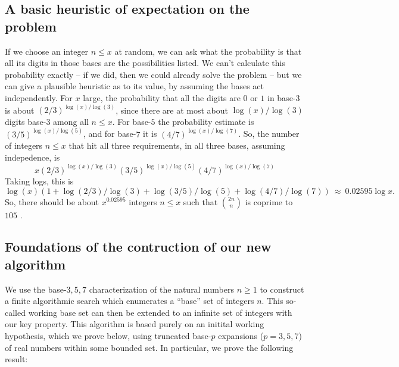 \documentclass[12pt]{article}
\begin{document}
\subsection{A basic heuristic of expectation on the problem}

If we choose an integer $n \leq x$ at random, we can ask what the 
probability is that all its digits in those bases are the possibilities 
listed.  We can't calculate this probability exactly -- if we did, then we
could already solve the problem -- but we can give a plausible heuristic
as to its value, by assuming the bases act independently.  For $x$ large,
the probability that all the digits are $0$ or $1$ in base-$3$ is 
about $(2/3)^{\log(x)/\log(3)}$, since there are at most 
about $\log(x)/\log(3)$ digits base-$3$ among all $n \leq x$.  For base-$5$
the probability estimate is $(3/5)^{\log(x)/\log(5)}$, and for base-$7$
it is $(4/7)^{\log(x)/\log(7)}$.  So, the number of integers $n \leq x$
that hit all three requirements, in all three bases, assuming indepedence,
is 
$$
x (2/3)^{\log(x)/\log(3)} (3/5)^{\log(x)/\log(5)} (4/7)^{\log(x)/\log(7)}
$$
Taking logs, this is
$$
\log(x) \left ( 1 + \log(2/3)/\log(3) + \log(3/5)/\log(5) + \log(4/7)/\log(7)
\right )\ \approx\ 0.02595 \log x.
$$
So, there should be about $x^{0.02595}$ integers $n \leq x$ such that 
${2n \choose n}$ is coprime to $105$ \cite[cf.\ \S 4]{POM-CENTBINOM}. 

\subsection{Foundations of the contruction of our new algorithm} 

We use the base-$3,5,7$ characterization of the natural numbers $n \geq 1$ 
to construct a finite algorithmic search which 
enumerates a ``base'' set of integers $n$. This so-called working base set can then 
be extended to an infinite set of integers with our 
key property. This algorithm is based purely on an initital working hypothesis, which we prove below, 
using truncated base-$p$ expansions ($p = 3,5,7$) of real numbers within some bounded set. 
In particular, we prove the following result: 
\end{document}

